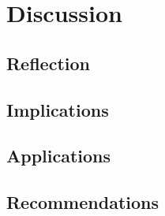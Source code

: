 \chapter{Discussion\label{cha:discussion}}

\section{Reflection}

\section{Implications}

\section{Applications}

\section{Recommendations}
